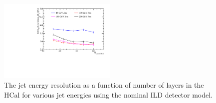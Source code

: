 \begin{figure}
\centering
\includegraphics[width=0.5\textwidth]{OptimisationStudies/Plots/JetEnergyResolutions/JER_vs_NumberOfHCalLayersOfFixedDepth.pdf}
\caption[The jet energy resolution as a function of number of layers in the HCal for various jet energies using the nominal ILD detector model.]{The jet energy resolution as a function of number of layers in the HCal for various jet energies using the nominal ILD detector model.}
\label{fig:hcalnfixedlayers}
\end{figure}


